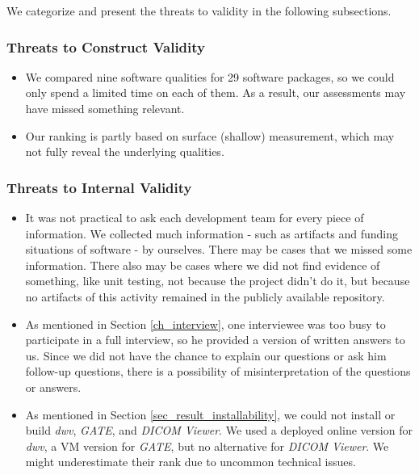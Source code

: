 \documentclass[final, 3p, times, authoryear]{elsarticle}
\begin{document}
\noindent We categorize and present the threats to validity in the following subsections.

\subsubsection{Threats to Construct Validity}
\begin{itemize}
\item We compared nine software qualities for 29 software packages, so we could
only spend a limited time on each of them. As a result, our assessments may have
missed something relevant.
\item Our ranking is partly based on surface (shallow) measurement, which may
not fully reveal the underlying qualities.
\end{itemize}

\subsubsection{Threats to Internal Validity}
\begin{itemize}
\item It was not practical to ask each development team for every piece of
information. We collected much information - such as artifacts and funding
situations of software - by ourselves. There may be cases that we missed some
information.  There also may be cases where we did not find evidence of
something, like unit testing, not because the project didn't do it, but because
no artifacts of this activity remained in the publicly available repository.
\item As mentioned in Section \ref{ch_interview}, one interviewee was too busy
to participate in a full interview, so he provided a version of written answers
to us. Since we did not have the chance to explain our questions or ask him
follow-up questions, there is a possibility of misinterpretation of the
questions or answers.
\item As mentioned in Section \ref{sec_result_installability}, we could not
install or build \textit{dwv}, \textit{GATE}, and \textit{DICOM Viewer}. We used
a deployed online version for \textit{dwv}, a VM version for \textit{GATE}, but
no alternative for \textit{DICOM Viewer}. We might underestimate their rank due
to uncommon technical issues.
\end{itemize}
\end{document}
